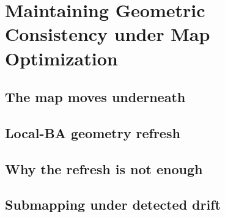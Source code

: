 \chapter{Maintaining Geometric Consistency under Map Optimization}
\label{ch:geometric_consistency}


\section{The map moves underneath}
\label{sec:geo_problem}

\section{Local-BA geometry refresh}
\label{sec:geo_refresh}

\section{Why the refresh is not enough}
\label{sec:geo_limits}

\section{Submapping under detected drift}
\label{sec:geo_submaps}

